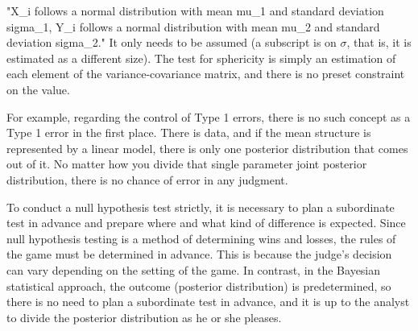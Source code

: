 \documentclass{ltjsbook}
\begin{document}
"X_i follows a normal distribution with mean mu_1 and standard deviation sigma_1, Y_i follows a normal distribution with mean mu_2 and standard deviation sigma_2."
It only needs to be assumed (a subscript is on $\sigma$, that is, it is estimated as a different size). The test for sphericity is simply an estimation of each element of the variance-covariance matrix, and there is no preset constraint on the value.

For example, regarding the control of Type 1 errors, there is no such concept as a Type 1 error in the first place. There is data, and if the mean structure is represented by a linear model, there is only one posterior distribution that comes out of it. No matter how you divide that single parameter joint posterior distribution, there is no chance of error in any judgment.

To conduct a null hypothesis test strictly, it is necessary to plan a subordinate test in advance and prepare where and what kind of difference is expected. Since null hypothesis testing is a method of determining wins and losses, the rules of the game must be determined in advance. This is because the judge's decision can vary depending on the setting of the game. In contrast, in the Bayesian statistical approach, the outcome (posterior distribution) is predetermined, so there is no need to plan a subordinate test in advance, and it is up to the analyst to divide the posterior distribution as he or she pleases.
\end{document}
